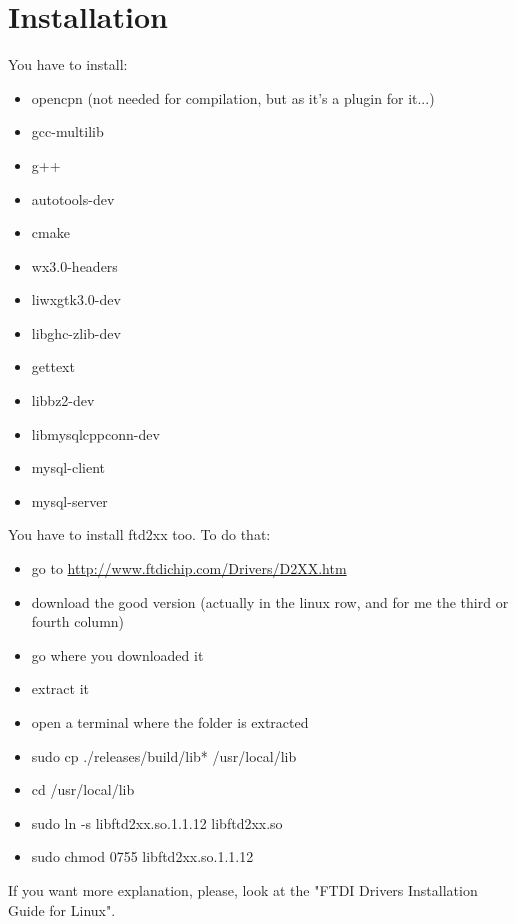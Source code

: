 \documentclass[11pt]{report}
\begin{document}
	    \section{Installation}
            You have to install:
            \begin{itemize}
                \item opencpn (not needed for compilation, but as it's a plugin for it...)
                \item gcc-multilib
                \item g++
                \item autotools-dev
                \item cmake
                \item wx3.0-headers
                \item liwxgtk3.0-dev
                \item libghc-zlib-dev
                \item gettext
                \item libbz2-dev
                \item libmysqlcppconn-dev 
                \item mysql-client
                \item mysql-server
            \end{itemize}
            You have to install ftd2xx too. To do that:
            \begin{itemize}
                \item go to \url{http://www.ftdichip.com/Drivers/D2XX.htm}
                \item download the good version (actually in the linux row, and for me the third or fourth column)
                \item go where you downloaded it
                \item extract it
                \item open a terminal where the folder is extracted
                \item sudo cp ./releases/build/lib* /usr/local/lib
                \item cd /usr/local/lib
                \item sudo ln -s libftd2xx.so.1.1.12 libftd2xx.so
                \item sudo chmod 0755 libftd2xx.so.1.1.12
            \end{itemize}
            If you want more explanation, please, look at the "FTDI Drivers Installation Guide for Linux".
\end{document}
